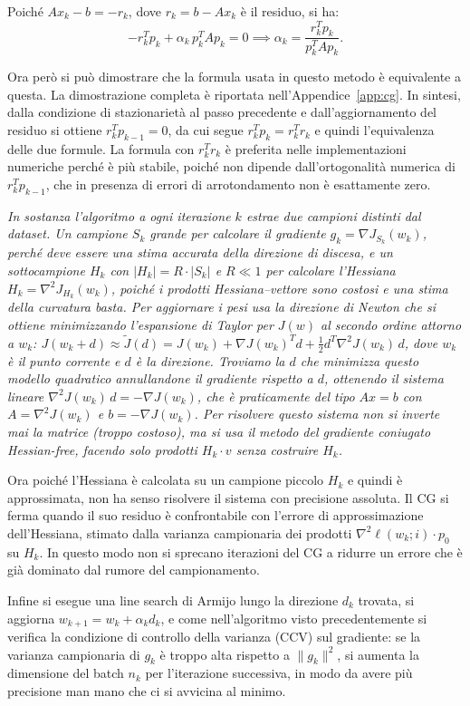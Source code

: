 \documentclass[a4paper,12pt]{article}
\numberwithin{equation}{section}
\numberwithin{figure}{section}
\numberwithin{table}{section}
\begin{document}
\begin{mnbox}
Poiché $A x_k - b = -r_k$, dove $r_k = b - A x_k$ è il residuo, si ha:
\[
- r_k^T p_k + \alpha_k \, p_k^T A p_k = 0 \implies
\alpha_k = \frac{r_k^T p_k}{p_k^T A p_k}. \tag{5.40}
\]

Ora però si può dimostrare che la formula usata in questo metodo è equivalente a questa. La dimostrazione completa è riportata nell'Appendice~\ref{app:cg}. In sintesi, dalla condizione di stazionarietà al passo precedente e dall'aggiornamento del residuo si ottiene $r_k^T p_{k-1} = 0$, da cui segue $r_k^T p_k = r_k^T r_k$ e quindi l'equivalenza delle due formule. La formula con $r_k^T r_k$ è preferita nelle implementazioni numeriche perché è più stabile, poiché non dipende dall'ortogonalità numerica di $r_k^T p_{k-1}$, che in presenza di errori di arrotondamento non è esattamente zero.
\end{mnbox}

{\itshape
In sostanza l'algoritmo a ogni iterazione $k$ estrae due campioni distinti dal dataset. Un campione $S_k$ grande per calcolare il gradiente $g_k = \nabla J_{S_k}(w_k)$, perché deve essere una stima accurata della direzione di discesa, e un sottocampione $H_k$ con $|H_k| = R \cdot |S_k|$ e $R \ll 1$ per calcolare l'Hessiana $H_k = \nabla^2 J_{H_k}(w_k)$, poiché i prodotti Hessiana–vettore sono costosi e una stima della curvatura basta.
Per aggiornare i pesi usa la direzione di Newton che si ottiene minimizzando l'espansione di Taylor per $J(w)$ al secondo ordine attorno a $w_k$: $J(w_k + d) \approx \tilde{J}(d) = J(w_k) + \nabla J(w_k)^{\!T} d + \frac{1}{2} d^{\!T} \nabla^2 J(w_k) \, d$, dove $w_k$ è il punto corrente e $d$ è la direzione. Troviamo la $d$ che minimizza questo modello quadratico annullandone il gradiente rispetto a $d$, ottenendo il sistema lineare $\nabla^2 J(w_k) \, d = -\nabla J(w_k)$, che è praticamente del tipo $Ax = b$ con $A = \nabla^2 J(w_k)$ e $b = -\nabla J(w_k)$. Per risolvere questo sistema non si inverte mai la matrice (troppo costoso), ma si usa il metodo del gradiente coniugato Hessian-free, facendo solo prodotti $H_k \cdot v$ senza costruire $H_k$.

Ora poiché l'Hessiana è calcolata su un campione piccolo $H_k$ e quindi è approssimata, non ha senso risolvere il sistema con precisione assoluta. Il CG si ferma quando il suo residuo è confrontabile con l'errore di approssimazione dell'Hessiana, stimato dalla varianza campionaria dei prodotti $\nabla^2 \ell(w_k; i) \cdot p_0$ su $H_k$. In questo modo non si sprecano iterazioni del CG a ridurre un errore che è già dominato dal rumore del campionamento.

Infine si esegue una line search di Armijo lungo la direzione $d_k$ trovata, si aggiorna $w_{k+1} = w_k + \alpha_k d_k$, e come nell'algoritmo visto precedentemente si verifica la condizione di controllo della varianza (CCV) sul gradiente: se la varianza campionaria di $g_k$ è troppo alta rispetto a $\|g_k\|^2$, si aumenta la dimensione del batch $n_k$ per l'iterazione successiva, in modo da avere più precisione man mano che ci si avvicina al minimo.}
\end{document}
